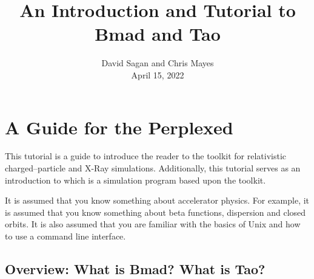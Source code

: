 \documentclass{hitec}     %
\title{An Introduction and Tutorial to Bmad and Tao}
\author{}
\date{David Sagan and Chris Mayes \\ April 15, 2022}
\newcommand{\Section}[1]{\section{#1}\vspace*{-1ex}}
\begin{document}
\maketitle

\cleardoublepage
{}
{}
\tableofcontents

\newpage

\Section{A Guide for the Perplexed}
\label{s:guide}

This tutorial is a guide to introduce the reader to the \bmad toolkit for relativistic
charged--particle and X-Ray simulations. Additionally, this tutorial serves as an introduction
to \tao which is a simulation program based upon the \bmad toolkit.

It is assumed that you know something about accelerator physics. For example, it is assumed that
you know something about beta functions, dispersion and closed orbits. It is also assumed that
you are familiar with the basics of Unix and how to use a command line interface.

\subsection{Overview: What is Bmad? What is Tao?}
\label{s:overview}
\end{document}
